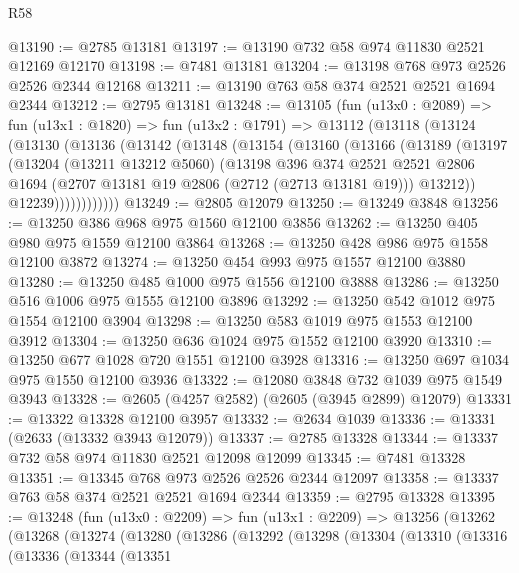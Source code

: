 \begin{lexlean}{R58}
\begin{coremodule}
@13190 := @2785 @13181
@13197 := @13190 @732 @58 @974 @11830 @2521 @12169 @12170
@13198 := @7481 @13181
@13204 := @13198 @768 @973 @2526 @2526 @2344 @12168
@13211 := @13190 @763 @58 @374 @2521 @2521 @1694 @2344
@13212 := @2795 @13181
@13248 := @13105
    (fun (u13x0 : @2089) =>
    fun (u13x1 : @1820) =>
    fun (u13x2 : @1791) =>
    @13112
      (@13118
        (@13124
          (@13130
            (@13136
              (@13142
                (@13148
                  (@13154
                    (@13160
                      (@13166
                        (@13189
                          (@13197
                            (@13204
                              (@13211 @13212 @5060)
                              (@13198
                                @396
                                @374
                                @2521
                                @2521
                                @2806
                                @1694
                                (@2707 @13181 @19 @2806 (@2712 (@2713 @13181 @19)))
                                @13212))
                            @12239))))))))))))
@13249 := @2805 @12079
@13250 := @13249 @3848
@13256 := @13250 @386 @968 @975 @1560 @12100 @3856
@13262 := @13250 @405 @980 @975 @1559 @12100 @3864
@13268 := @13250 @428 @986 @975 @1558 @12100 @3872
@13274 := @13250 @454 @993 @975 @1557 @12100 @3880
@13280 := @13250 @485 @1000 @975 @1556 @12100 @3888
@13286 := @13250 @516 @1006 @975 @1555 @12100 @3896
@13292 := @13250 @542 @1012 @975 @1554 @12100 @3904
@13298 := @13250 @583 @1019 @975 @1553 @12100 @3912
@13304 := @13250 @636 @1024 @975 @1552 @12100 @3920
@13310 := @13250 @677 @1028 @720 @1551 @12100 @3928
@13316 := @13250 @697 @1034 @975 @1550 @12100 @3936
@13322 := @12080 @3848 @732 @1039 @975 @1549 @3943
@13328 := @2605 (@4257 @2582) (@2605 (@3945 @2899) @12079)
@13331 := @13322 @13328 @12100 @3957
@13332 := @2634 @1039
@13336 := @13331 (@2633 (@13332 @3943 @12079))
@13337 := @2785 @13328
@13344 := @13337 @732 @58 @974 @11830 @2521 @12098 @12099
@13345 := @7481 @13328
@13351 := @13345 @768 @973 @2526 @2526 @2344 @12097
@13358 := @13337 @763 @58 @374 @2521 @2521 @1694 @2344
@13359 := @2795 @13328
@13395 := @13248
    (fun (u13x0 : @2209) =>
    fun (u13x1 : @2209) =>
    @13256
      (@13262
        (@13268
          (@13274
            (@13280
              (@13286
                (@13292
                  (@13298
                    (@13304
                      (@13310
                        (@13316
                          (@13336
                            (@13344
                              (@13351

\end{coremodule}
\end{lexlean}
